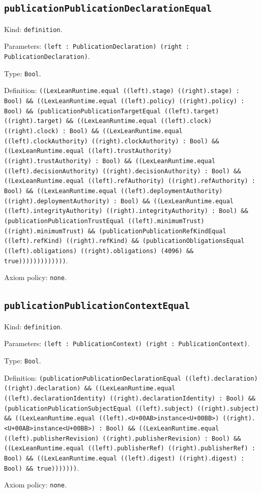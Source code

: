\documentclass[11pt]{article}
\begin{document}
\subsection*{\texttt{publicationPublicationDeclarationEqual}}
\noindent Kind: \texttt{definition}.\par
\noindent Parameters: \texttt{(left : PublicationDeclaration) (right : PublicationDeclaration)}.\par
\noindent Type: \texttt{Bool}.\par
\noindent Definition: \texttt{((LexLeanRuntime.equal ((left).stage) ((right).stage) : Bool) \&\& ((LexLeanRuntime.equal ((left).policy) ((right).policy) : Bool) \&\& (publicationPublicationTargetEqual ((left).target) ((right).target) \&\& ((LexLeanRuntime.equal ((left).clock) ((right).clock) : Bool) \&\& ((LexLeanRuntime.equal ((left).clockAuthority) ((right).clockAuthority) : Bool) \&\& ((LexLeanRuntime.equal ((left).trustAuthority) ((right).trustAuthority) : Bool) \&\& ((LexLeanRuntime.equal ((left).decisionAuthority) ((right).decisionAuthority) : Bool) \&\& ((LexLeanRuntime.equal ((left).refAuthority) ((right).refAuthority) : Bool) \&\& ((LexLeanRuntime.equal ((left).deploymentAuthority) ((right).deploymentAuthority) : Bool) \&\& ((LexLeanRuntime.equal ((left).integrityAuthority) ((right).integrityAuthority) : Bool) \&\& (publicationPublicationTrustEqual ((left).minimumTrust) ((right).minimumTrust) \&\& (publicationPublicationRefKindEqual ((left).refKind) ((right).refKind) \&\& (publicationObligationsEqual ((left).obligations) ((right).obligations) (4096) \&\& true)))))))))))))}.\par
\noindent Axiom policy: \texttt{none}.\par
\subsection*{\texttt{publicationPublicationContextEqual}}
\noindent Kind: \texttt{definition}.\par
\noindent Parameters: \texttt{(left : PublicationContext) (right : PublicationContext)}.\par
\noindent Type: \texttt{Bool}.\par
\noindent Definition: \texttt{(publicationPublicationDeclarationEqual ((left).declaration) ((right).declaration) \&\& ((LexLeanRuntime.equal ((left).declarationIdentity) ((right).declarationIdentity) : Bool) \&\& (publicationPublicationSubjectEqual ((left).subject) ((right).subject) \&\& ((LexLeanRuntime.equal ((left).<U+00AB>instance<U+00BB>) ((right).<U+00AB>instance<U+00BB>) : Bool) \&\& ((LexLeanRuntime.equal ((left).publisherRevision) ((right).publisherRevision) : Bool) \&\& ((LexLeanRuntime.equal ((left).publisherRef) ((right).publisherRef) : Bool) \&\& ((LexLeanRuntime.equal ((left).digest) ((right).digest) : Bool) \&\& true)))))))}.\par
\noindent Axiom policy: \texttt{none}.\par
\end{document}
